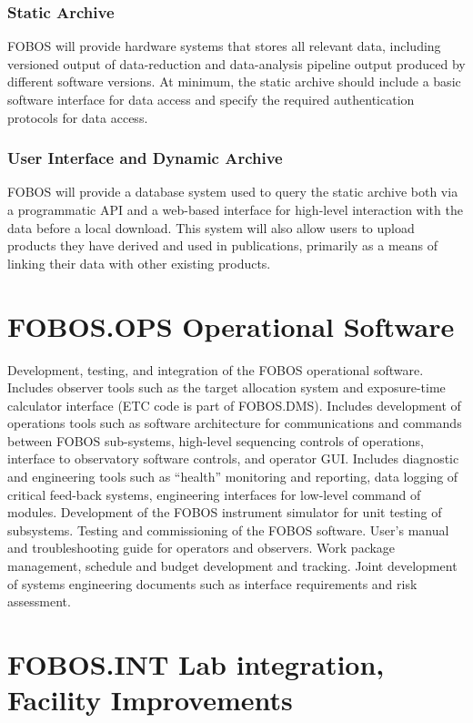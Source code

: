 \documentclass[oneside,11pt]{amsart}
\begin{document}
\subsubsection{Static Archive}

FOBOS will provide hardware systems that stores all relevant data,
including versioned output of data-reduction and data-analysis
pipeline output produced by different software versions. At minimum,
the static archive should include a basic software interface for data
access and specify the required authentication protocols for data
access.

\subsubsection{User Interface and Dynamic Archive}

FOBOS will provide a database system used to query the static archive
both via a programmatic API and a web-based interface for high-level
interaction with the data before a local download. This system will
also allow users to upload products they have derived and used in
publications, primarily as a means of linking their data with other
existing products.

\section{FOBOS.OPS Operational Software}

Development, testing, and integration of the FOBOS operational
software. Includes observer tools such as the target allocation
system and exposure-time calculator interface (ETC code is part of
FOBOS.DMS). Includes development of operations tools such as software
architecture for communications and commands between FOBOS
sub-systems, high-level sequencing controls of operations, interface
to observatory software controls, and operator GUI. Includes
diagnostic and engineering tools such as “health” monitoring and
reporting, data logging of critical feed-back systems, engineering
interfaces for low-level command of modules. Development of the FOBOS
instrument simulator for unit testing of subsystems. Testing and
commissioning of the FOBOS software. User’s manual and
troubleshooting guide for operators and observers. Work package
management, schedule and budget development and tracking. Joint
development of systems engineering documents such as interface
requirements and risk assessment.

\section{FOBOS.INT Lab integration, Facility Improvements}
\end{document}
